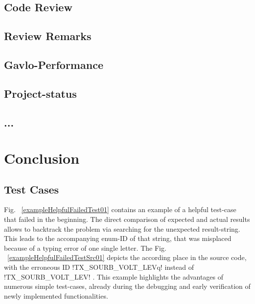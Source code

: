 \documentclass[master,english,smartquotes,apa]{hgbthesis}
\begin{document}
		\section{Code Review}
		\section{Review Remarks}
		\section{Gavlo-Performance}
		\section{Project-status}
		\section{ ... }
	\chapter{Conclusion}
	\label{cha:Conclusion}
	\section{Test Cases}
	Fig. ~\ref{exampleHelpfulFailedTest01} contains an example of a helpful test-case that failed in the beginning. The direct comparison of expected and actual results allows to backtrack the problem via searching for the unexpected result-string. This leads to the accompanying enum-ID of that string, that was misplaced because of a typing error of one single letter. 
	The Fig. ~\ref{exampleHelpfulFailedTestSrc01} depicts the according place in the source code, with the erroneous ID \lstC !TX_SOURB_VOLT_LEVq! instead of \lstC !TX_SOURB_VOLT_LEV! .
	This example highlights the advantages of numerous simple test-cases, already during the debugging and early verification of newly implemented functionalities.
	

% 
% 
% 
% 
% 

\appendix                                                             %
\end{document}
